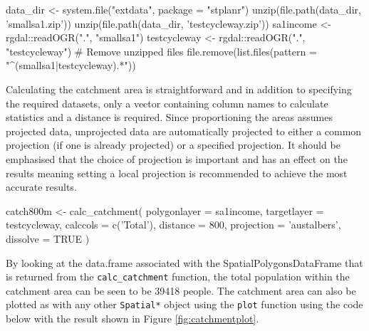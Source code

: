 \begin{Schunk}
\begin{Sinput}
data_dir <- system.file("extdata", package = "stplanr")
unzip(file.path(data_dir, 'smallsa1.zip'))
unzip(file.path(data_dir, 'testcycleway.zip'))
sa1income <- rgdal::readOGR(".", "smallsa1")
testcycleway <- rgdal::readOGR(".", "testcycleway")
# Remove unzipped files
file.remove(list.files(pattern = "^(smallsa1|testcycleway).*"))
\end{Sinput}
\end{Schunk}

Calculating the catchment area is straightforward and in addition to
specifying the required datasets, only a vector containing column names
to calculate statistics and a distance is required. Since proportioning
the areas assumes projected data, unprojected data are automatically
projected to either a common projection (if one is already projected) or
a specified projection. It should be emphasised that the choice of
projection is important and has an effect on the results meaning setting
a local projection is recommended to achieve the most accurate results.

\begin{Schunk}
\begin{Sinput}
catch800m <- calc_catchment(
  polygonlayer = sa1income,
  targetlayer = testcycleway,
  calccols = c('Total'),
  distance = 800,
  projection = 'austalbers',
  dissolve = TRUE
)
\end{Sinput}
\end{Schunk}

By looking at the data.frame associated with the
SpatialPolygonsDataFrame that is returned from the
\texttt{calc\_catchment} function, the total population within the
catchment area can be seen to be 39418 people. The catchment area can
also be plotted as with any other \texttt{Spatial*} object using the
\texttt{plot} function using the code below with the result shown in
Figure \ref{fig:catchmentplot}.

